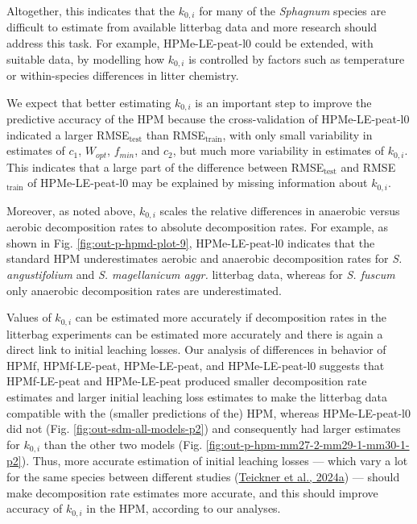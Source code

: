 \documentclass[
  12pt,
]{article}
\begin{document}
Altogether, this indicates that the \(k_{0,i}\) for many of the \emph{Sphagnum} species are difficult to estimate from available litterbag data and more research should address this task. For example, HPMe-LE-peat-l0 could be extended, with suitable data, by modelling how \(k_{0,i}\) is controlled by factors such as temperature or within-species differences in litter chemistry.

We expect that better estimating \(k_{0,i}\) is an important step to improve the predictive accuracy of the HPM because the cross-validation of HPMe-LE-peat-l0 indicated a larger RMSE\(_\text{test}\) than RMSE\(_\text{train}\), with only small variability in estimates of \(c_1\), \(W_{opt}\), \(f_{min}\), and \(c_2\), but much more variability in estimates of \(k_{0,i}\). This indicates that a large part of the difference between RMSE\(_\text{test}\) and RMSE\(_\text{train}\) of HPMe-LE-peat-l0 may be explained by missing information about \(k_{0,i}\).

Moreover, as noted above, \(k_{0,i}\) scales the relative differences in anaerobic versus aerobic decomposition rates to absolute decomposition rates. For example, as shown in Fig. \ref{fig:out-p-hpmd-plot-9}, HPMe-LE-peat-l0 indicates that the standard HPM underestimates aerobic and anaerobic decomposition rates for \emph{S. angustifolium} and \emph{S. magellanicum aggr.} litterbag data, whereas for \emph{S. fuscum} only anaerobic decomposition rates are underestimated.

Values of \(k_{0,i}\) can be estimated more accurately if decomposition rates in the litterbag experiments can be estimated more accurately and there is again a direct link to initial leaching losses. Our analysis of differences in behavior of HPMf, HPMf-LE-peat, HPMe-LE-peat, and HPMe-LE-peat-l0 suggests that HPMf-LE-peat and HPMe-LE-peat produced smaller decomposition rate estimates and larger initial leaching loss estimates to make the litterbag data compatible with the (smaller predictions of the) HPM, whereas HPMe-LE-peat-l0 did not (Fig. \ref{fig:out-sdm-all-models-p2}) and consequently had larger estimates for \(k_{0,i}\) than the other two models (Fig. \ref{fig:out-p-hpm-mm27-2-mm29-1-mm30-1-p2}). Thus, more accurate estimation of initial leaching losses --- which vary a lot for the same species between different studies (\protect\hyperlink{ref-Teickner.2024}{Teickner et al., 2024a}) --- should make decomposition rate estimates more accurate, and this should improve accuracy of \(k_{0,i}\) in the HPM, according to our analyses.
\end{document}
